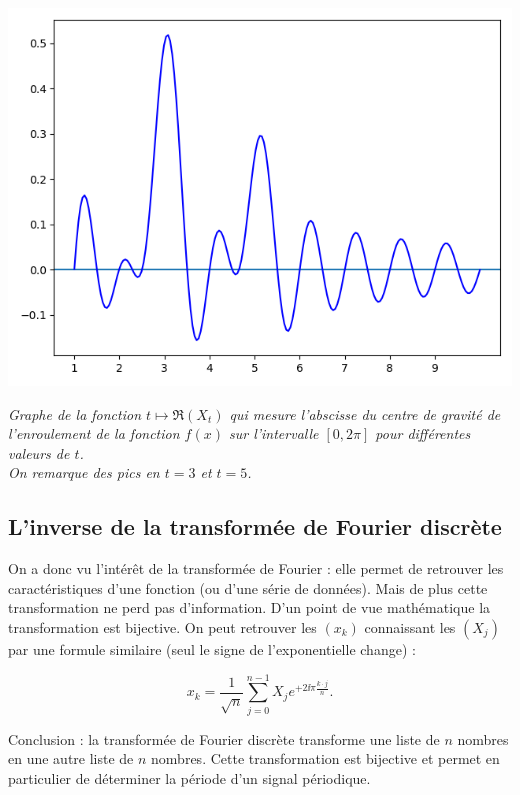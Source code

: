 \documentclass[11pt,class=report,crop=false]{standalone}
\begin{document}
\begin{center}
\includegraphics[scale=\myscale,scale=0.5]{figures/fourier-10}

\nopagebreak

\begin{minipage}{0.8\textwidth}
\center\emph{Graphe de la fonction $t \mapsto \Re(X_t)$ qui mesure l'abscisse du centre de gravité de l'enroulement de la fonction $f(x)$ sur l'intervalle $[0,2\pi]$ pour différentes valeurs de $t$.\\ On remarque des pics en $t=3$ et $t=5$.
}
\end{minipage}
\end{center}


\subsection{L'inverse de la transformée de Fourier discrète}

On a donc vu l'intérêt de la transformée de Fourier : elle permet de retrouver les caractéristiques d'une fonction (ou d'une série de données). Mais de plus cette transformation ne perd pas d'information. D'un point de vue mathématique la transformation est bijective. On peut retrouver les $(x_k)$ connaissant les $(X_j)$ par une formule similaire (seul le signe de l'exponentielle change) :

$$x_k = \frac{1}{\sqrt n}\sum_{j=0}^{n-1} X_j e^{+2\ii\pi \frac{k \cdot j}{n}}.$$


Conclusion : la transformée de Fourier discrète transforme une liste de $n$ nombres en  une autre liste de $n$ nombres. Cette transformation est bijective et permet en particulier de déterminer la période d'un signal périodique.
\end{document}
